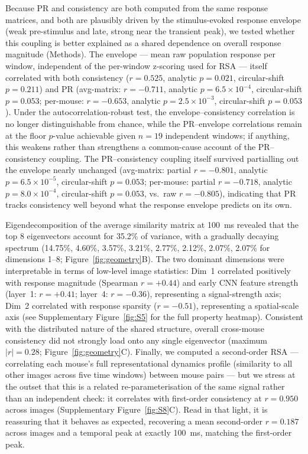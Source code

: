 \documentclass[11pt,onecolumn]{article}
\begin{document}
Because PR and consistency are both computed from the same response
matrices, and both are plausibly driven by the stimulus-evoked response
envelope (weak pre-stimulus and late, strong near the transient peak), we
tested whether this coupling is better explained as a shared dependence on
overall response magnitude (Methods).  The
envelope --- mean raw population response per window, independent of the
per-window z-scoring used for RSA --- itself correlated with both
consistency ($r = 0.525$, analytic $p = 0.021$, circular-shift
$p = 0.211$) and PR (avg-matrix: $r = -0.711$, analytic
$p = 6.5\times10^{-4}$, circular-shift $p = 0.053$; per-mouse:
$r = -0.653$, analytic $p = 2.5\times10^{-3}$, circular-shift $p = 0.053$).
Under the autocorrelation-robust test, the envelope--consistency
correlation is no longer distinguishable from chance, while the
PR--envelope correlations remain at the floor $p$-value achievable given
$n = 19$ independent windows; if anything, this weakens
rather than strengthens a common-cause account of the PR--consistency
coupling.  The PR--consistency coupling itself survived partialling out
the envelope nearly unchanged (avg-matrix: partial $r = -0.801$, analytic
$p = 6.5\times10^{-5}$, circular-shift $p = 0.053$; per-mouse: partial
$r = -0.718$, analytic $p = 8.0\times10^{-4}$, circular-shift $p = 0.053$,
vs.\ raw $r = -0.805$), indicating that PR tracks consistency well beyond
what the response envelope predicts on its own.

Eigendecomposition of the average similarity matrix at 100~ms revealed
that the top 8 eigenvectors account for 35.2\% of variance, with a
gradually decaying spectrum (14.75\%, 4.60\%, 3.57\%, 3.21\%, 2.77\%,
2.12\%, 2.07\%, 2.07\% for dimensions 1--8; Figure~\ref{fig:geometry}B).
The two dominant dimensions were interpretable in terms of low-level
image statistics: Dim~1 correlated positively with response magnitude
(Spearman $r = +0.44$) and early CNN feature strength
(layer~1: $r = +0.41$; layer~4: $r = -0.36$), representing a
signal-strength axis; Dim~2 correlated with response sparsity
($r = -0.51$), representing a spatial-scale axis (see Supplementary
Figure~\ref{fig:S5} for the full property heatmap).  Consistent with the
distributed nature of the shared structure, overall cross-mouse
consistency did not strongly load onto any single eigenvector
(maximum $|r| = 0.28$; Figure~\ref{fig:geometry}C).  Finally, we computed
a second-order RSA --- correlating each mouse's full representational
dynamics profile (similarity to all other images across five time
windows) between mouse pairs --- but we stress at the outset that this is
a related re-parameterisation of the same signal rather than an
independent check: it correlates with first-order consistency at
$r = 0.950$ across images (Supplementary Figure~\ref{fig:S8}C).  Read in
that light, it is reassuring that it behaves as expected, recovering a
mean second-order $r = 0.187$ across images and a temporal peak at exactly
100~ms, matching the first-order peak.
\end{document}
